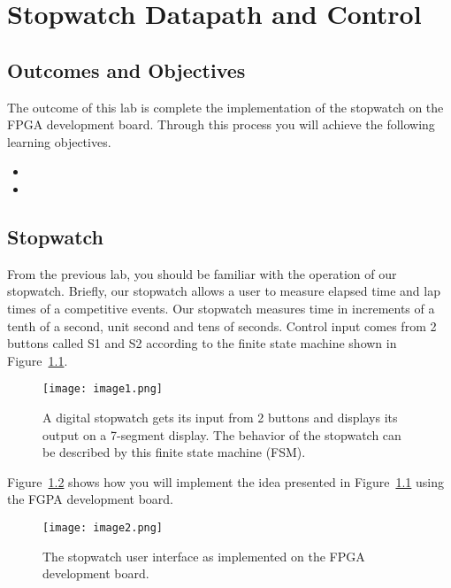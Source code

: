 \chapter{Stopwatch Datapath and Control}
\label{chapter:swDpAndCu}
\graphicspath{ {./Lab11Stopwatch/Fig} }

\section{Outcomes and Objectives}

The outcome of this lab is complete the implementation
of the stopwatch  on the FPGA development board.
Through this process you will achieve the following
learning objectives.
\begin{itemize}
	\item {}
	\item {}
\end{itemize}



\section{Stopwatch}

From the previous lab, you should be familiar with the operation of our
stopwatch. Briefly, our stopwatch allows a user to measure elapsed time
and lap times of a competitive events. Our stopwatch measures time in
increments of a tenth of a second, unit second and tens of seconds.
Control input comes from 2 buttons called S1 and S2 according to the
finite state machine shown in Figure~\ref{fig:swHighLevel}.

\begin{figure}[ht]
\texttt{[image: image1.png]}
\caption{A digital stopwatch gets its input from 2 buttons and displays
its output on a 7-segment display. The behavior of the stopwatch can be
described by this finite state machine (FSM).}
\label{fig:swHighLevel}
\end{figure}

Figure~\ref{fig:swDevBoard} shows how you will implement the idea presented in Figure~\ref{fig:swHighLevel}
using the FGPA development board.

\begin{figure}[ht]
\texttt{[image: image2.png]}
\caption{The stopwatch user interface as implemented on the FPGA
development board.}
\label{fig:swDevBoard}
\end{figure}

